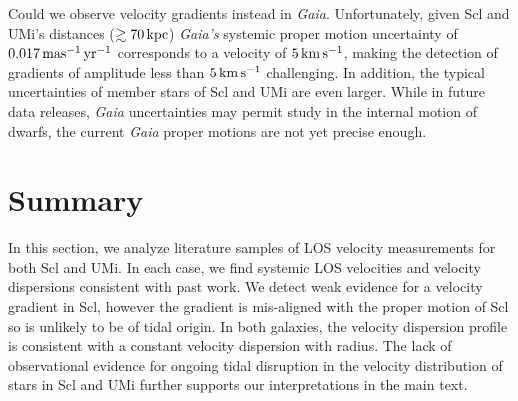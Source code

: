 Could we observe velocity gradients instead in \emph{Gaia}.
Unfortunately, given Scl and UMi's distances (\(\gtrsim 70\,{\rm kpc}\))
\emph{Gaia's} systemic proper motion uncertainty of \(0.017\,{\rm mas^{-1}\,yr^{-1}}\)
corresponds to a velocity of \(5\,{\rm km\,s^{-1}}\), making the detection of
gradients of amplitude less than \(5\,{\rm km\,s^{-1}}\) challenging. In addition,
the typical uncertainties of member stars of Scl and UMi are even
larger. While in future data releases, \emph{Gaia} uncertainties may
permit study in the internal motion of dwarfs, the current \emph{Gaia}
proper motions are not yet precise enough.

\section{Summary}\label{summary}

In this section, we analyze literature samples of LOS velocity
measurements for both Scl and UMi. In each case, we find systemic LOS
velocities and velocity dispersions consistent with past work. We detect
weak evidence for a velocity gradient in Scl, however the gradient is
mis-aligned with the proper motion of Scl so is unlikely to be of tidal
origin. In both galaxies, the velocity dispersion profile is consistent
with a constant velocity dispersion with radius. The lack of
observational evidence for ongoing tidal disruption in the velocity
distribution of stars in Scl and UMi further supports our
interpretations in the main text.
